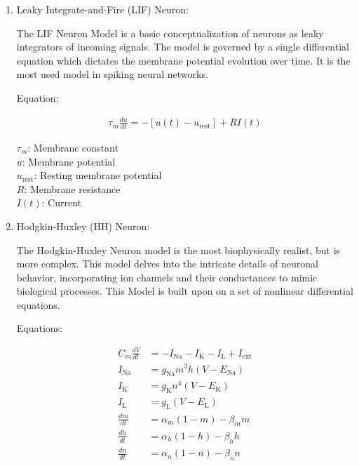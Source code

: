 \documentclass[11pt]{article}
\begin{document}
\begin{enumerate}
  \item  Leaky Integrate-and-Fire (LIF) Neuron:

        The LIF Neuron Model\cite{neuronal_dynamics} is a basic conceptualization of neurons as leaky integrators of incoming signals. The model is governed by a single differential equation which dictates the membrane potential evolution over time. It is the most used model in spiking neural networks.


        Equation:

        \begin{align*}
          \tau_m \frac{du}{dt} = -[u(t) - u_{\text{rest}}] + RI(t)
        \end{align*}

        \(\tau_m\): Membrane constant\\
        \(u\): Membrane potential\\
        \(u_{\text{rest}}\): Resting membrane potential\\
        \(R\): Membrane resistance\\
        \(I(t)\): Current\\


  \item Hodgkin-Huxley (HH) Neuron:


        The Hodgkin-Huxley Neuron model is the most biophysically realist, but is more complex. This model delves into the intricate details of neuronal behavior, incorporating ion channels and their conductances to mimic biological processes. This Model is built upon on a set of nonlinear differential equations.

        Equations:

        \begin{align*}
          C_m \frac{dV}{dt} & = -I_{\text{Na}} - I_{\text{K}} - I_{\text{L}} + I_{\text{ext}} \\
          I_{\text{Na}}     & = g_{\text{Na}} m^3 h (V - E_{\text{Na}})                       \\
          I_{\text{K}}      & = g_{\text{K}} n^4 (V - E_{\text{K}})                           \\
          I_{\text{L}}      & = g_{\text{L}} (V - E_{\text{L}})                               \\
          \frac{dm}{dt}     & = \alpha_m (1 - m) - \beta_m m                                  \\
          \frac{dh}{dt}     & = \alpha_h (1 - h) - \beta_h h                                  \\
          \frac{dn}{dt}     & = \alpha_n (1 - n) - \beta_n n                                  \\
        \end{align*}



\end{enumerate}
\end{document}
